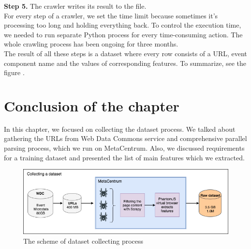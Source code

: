 \noindent\textbf{Step 5.} The crawler writes its result to the file. \\

For every step of a crawler, we set the time limit because sometimes it's processing too long and holding everything back. To control the execution time, we needed to run separate Python process for every time-consuming action. The whole crawling process has been ongoing for three months.\\

The result of all these steps is a dataset where every row consists of a URL, event component name and the values of corresponding features. To summarize, see the figure . 

\section*{Conclusion of the chapter}

In this chapter, we focused on collecting the dataset process. We talked about gathering the URLs from Web Data Commons service and comprehensive parallel parsing process, which we run on MetaCentrum. Also, we discussed requirements for a training dataset and presented the list of main features which we extracted. 


\begin{figure}[h]
\begin{center}
\includegraphics[width=1.0\textwidth]{dataset_collect}
\caption{The scheme of dataset collecting process}
\label{fig:collect}
\end{center}
\end{figure}
